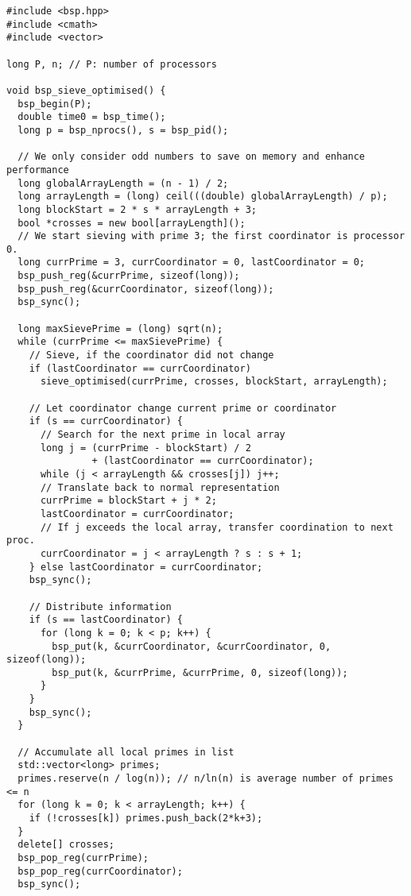 \documentclass[a4paper,12pt]{article}
\begin{document}
	\begin{lstlisting}[caption={Optimised parallel program for the Sieve of Eratosthenes}, label={prg:par_opt_sieve}, frame={single}]
#include <bsp.hpp>
#include <cmath>
#include <vector>

long P, n; // P: number of processors

void bsp_sieve_optimised() {
  bsp_begin(P);
  double time0 = bsp_time();
  long p = bsp_nprocs(), s = bsp_pid();

  // We only consider odd numbers to save on memory and enhance performance
  long globalArrayLength = (n - 1) / 2;
  long arrayLength = (long) ceil(((double) globalArrayLength) / p);
  long blockStart = 2 * s * arrayLength + 3;
  bool *crosses = new bool[arrayLength]();
  // We start sieving with prime 3; the first coordinator is processor 0.
  long currPrime = 3, currCoordinator = 0, lastCoordinator = 0;
  bsp_push_reg(&currPrime, sizeof(long));
  bsp_push_reg(&currCoordinator, sizeof(long));
  bsp_sync();

  long maxSievePrime = (long) sqrt(n);
  while (currPrime <= maxSievePrime) {
    // Sieve, if the coordinator did not change
    if (lastCoordinator == currCoordinator)
      sieve_optimised(currPrime, crosses, blockStart, arrayLength);

    // Let coordinator change current prime or coordinator
    if (s == currCoordinator) {
      // Search for the next prime in local array
      long j = (currPrime - blockStart) / 2
               + (lastCoordinator == currCoordinator);
      while (j < arrayLength && crosses[j]) j++;
      // Translate back to normal representation
      currPrime = blockStart + j * 2;
      lastCoordinator = currCoordinator;
      // If j exceeds the local array, transfer coordination to next proc.
      currCoordinator = j < arrayLength ? s : s + 1;
    } else lastCoordinator = currCoordinator;
    bsp_sync();

    // Distribute information
    if (s == lastCoordinator) {
      for (long k = 0; k < p; k++) {
        bsp_put(k, &currCoordinator, &currCoordinator, 0, sizeof(long));
        bsp_put(k, &currPrime, &currPrime, 0, sizeof(long));
      }
    }
    bsp_sync();
  }

  // Accumulate all local primes in list
  std::vector<long> primes;
  primes.reserve(n / log(n)); // n/ln(n) is average number of primes <= n
  for (long k = 0; k < arrayLength; k++) {
    if (!crosses[k]) primes.push_back(2*k+3);
  }
  delete[] crosses;
  bsp_pop_reg(currPrime);
  bsp_pop_reg(currCoordinator);
  bsp_sync();


\end{lstlisting}
\end{document}
